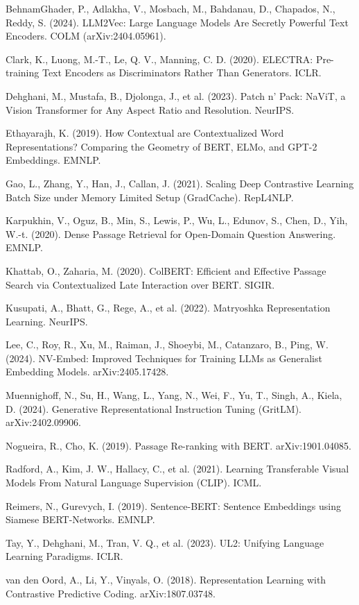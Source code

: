 \item BehnamGhader, P., Adlakha, V., Mosbach, M., Bahdanau, D., Chapados, N., Reddy, S. (2024). LLM2Vec: Large Language Models Are Secretly Powerful Text Encoders. COLM (arXiv:2404.05961).
\item Clark, K., Luong, M.-T., Le, Q. V., Manning, C. D. (2020). ELECTRA: Pre-training Text Encoders as Discriminators Rather Than Generators. ICLR.
\item Dehghani, M., Mustafa, B., Djolonga, J., et al. (2023). Patch n' Pack: NaViT, a Vision Transformer for Any Aspect Ratio and Resolution. NeurIPS.
\item Ethayarajh, K. (2019). How Contextual are Contextualized Word Representations? Comparing the Geometry of BERT, ELMo, and GPT-2 Embeddings. EMNLP.
\item Gao, L., Zhang, Y., Han, J., Callan, J. (2021). Scaling Deep Contrastive Learning Batch Size under Memory Limited Setup (GradCache). RepL4NLP.
\item Karpukhin, V., Oguz, B., Min, S., Lewis, P., Wu, L., Edunov, S., Chen, D., Yih, W.-t. (2020). Dense Passage Retrieval for Open-Domain Question Answering. EMNLP.
\item Khattab, O., Zaharia, M. (2020). ColBERT: Efficient and Effective Passage Search via Contextualized Late Interaction over BERT. SIGIR.
\item Kusupati, A., Bhatt, G., Rege, A., et al. (2022). Matryoshka Representation Learning. NeurIPS.
\item Lee, C., Roy, R., Xu, M., Raiman, J., Shoeybi, M., Catanzaro, B., Ping, W. (2024). NV-Embed: Improved Techniques for Training LLMs as Generalist Embedding Models. arXiv:2405.17428.
\item Muennighoff, N., Su, H., Wang, L., Yang, N., Wei, F., Yu, T., Singh, A., Kiela, D. (2024). Generative Representational Instruction Tuning (GritLM). arXiv:2402.09906.
\item Nogueira, R., Cho, K. (2019). Passage Re-ranking with BERT. arXiv:1901.04085.
\item Radford, A., Kim, J. W., Hallacy, C., et al. (2021). Learning Transferable Visual Models From Natural Language Supervision (CLIP). ICML.
\item Reimers, N., Gurevych, I. (2019). Sentence-BERT: Sentence Embeddings using Siamese BERT-Networks. EMNLP.
\item Tay, Y., Dehghani, M., Tran, V. Q., et al. (2023). UL2: Unifying Language Learning Paradigms. ICLR.
\item van den Oord, A., Li, Y., Vinyals, O. (2018). Representation Learning with Contrastive Predictive Coding. arXiv:1807.03748.
